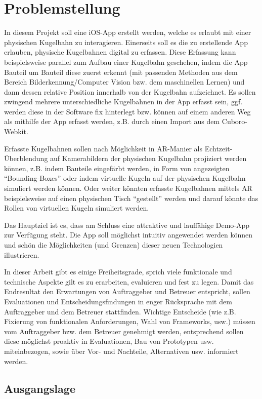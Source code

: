 \section{Problemstellung}
In diesem Projekt soll eine iOS-App erstellt werden, welche es erlaubt mit einer physischen Kugelbahn zu interagieren. Einerseits soll es die zu erstellende App erlauben, physische Kugelbahnen digital zu erfassen. Diese Erfassung kann beispielsweise parallel zum Aufbau einer Kugelbahn geschehen, indem die App Bauteil um Bauteil diese zuerst erkennt (mit passenden Methoden aus dem Bereich Bilderkennung/Computer Vision bzw. dem maschinellen Lernen) und dann dessen relative Position innerhalb von der Kugelbahn aufzeichnet. Es sollen zwingend mehrere unterschiedliche Kugelbahnen in der App erfasst sein, ggf. werden diese in der Software fix hinterlegt bzw. können auf einem anderen Weg als mithilfe der App erfasst werden, z.B. durch einen Import aus dem Cuboro-Webkit.


Erfasste Kugelbahnen sollen nach Möglichkeit in AR-Manier als Echtzeit-Überblendung auf Kamerabildern der physischen Kugelbahn projiziert werden können, z.B. indem Bauteile eingefärbt werden, in Form von angezeigten "`Bounding-Boxes"' oder indem virtuelle Kugeln auf der physischen Kugelbahn simuliert werden können. Oder weiter könnten erfasste Kugelbahnen mittels AR beispielsweise auf einen physischen Tisch "`gestellt"' werden und darauf könnte das Rollen von virtuellen Kugeln simuliert werden. 


Das Hauptziel ist es, dass am Schluss eine attraktive und lauffähige Demo-App zur Verfügung steht. Die App soll möglichst intuitiv angewendet werden können und schön die Möglichkeiten (und Grenzen) dieser neuen Technologien illustrieren.


In dieser Arbeit gibt es einige Freiheitsgrade, sprich viele funktionale und technische Aspekte gilt es zu erarbeiten, evaluieren und fest zu legen. Damit das Endresultat den Erwartungen von Auftraggeber und Betreuer entspricht, sollen Evaluationen und Entscheidungsfindungen in enger Rücksprache mit dem Auftraggeber und dem Betreuer stattfinden. Wichtige Entscheide (wie z.B. Fixierung von funktionalen Anforderungen, Wahl von Frameworks, usw.) müssen vom Auftraggeber bzw. dem Betreuer genehmigt werden, entsprechend sollen diese möglichst proaktiv in Evaluationen, Bau von Prototypen usw. miteinbezogen, sowie über Vor- und Nachteile, Alternativen usw. informiert werden.

\subsection{Ausgangslage}

